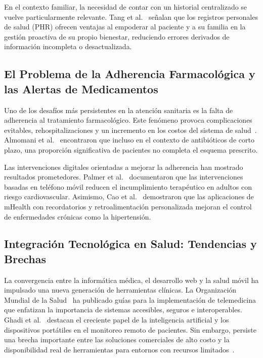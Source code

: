 \documentclass[12pt, letterpaper]{report}
\begin{document}
En el contexto familiar, la necesidad de contar con un historial centralizado se vuelve
particularmente relevante. Tang et al.~\cite{tang2006personal} señalan que los registros
personales de salud (PHR) ofrecen ventajas al empoderar al paciente y a su familia en
la gestión proactiva de su propio bienestar, reduciendo errores derivados de información
incompleta o desactualizada.

\subsection{El Problema de la Adherencia Farmacológica y las Alertas de Medicamentos}

Uno de los desafíos más persistentes en la atención sanitaria es la falta de adherencia
al tratamiento farmacológico. Este fenómeno provoca complicaciones evitables,
rehospitalizaciones y un incremento en los costos del sistema de
salud~\cite{gokoel2020medication}. Almomani et al.~\cite{almomani2023adherence}
encontraron que incluso en el contexto de antibióticos de corto plazo, una proporción
significativa de pacientes no completa el esquema prescrito.

Las intervenciones digitales orientadas a mejorar la adherencia han mostrado resultados
prometedores. Palmer et al.~\cite{palmer2021mobile} documentaron que las intervenciones
basadas en teléfono móvil reducen el incumplimiento terapéutico en adultos con riesgo
cardiovascular. Asimismo, Cao et al.~\cite{cao2022mhealth} demostraron que las
aplicaciones de mHealth con recordatorios y retroalimentación personalizada mejoran el
control de enfermedades crónicas como la hipertensión.

\subsection{Integración Tecnológica en Salud: Tendencias y Brechas}

La convergencia entre la informática médica, el desarrollo web y la salud móvil ha
impulsado una nueva generación de herramientas clínicas. La Organización Mundial de
la Salud~\cite{world2022consolidated} ha publicado guías para la implementación de
telemedicina que enfatizan la importancia de sistemas accesibles, seguros e
interoperables. Ghadi et al.~\cite{ghadi2025integration} destacan el creciente papel
de la inteligencia artificial y los dispositivos portátiles en el monitoreo remoto de
pacientes. Sin embargo, persiste una brecha importante entre las soluciones comerciales
de alto costo y la disponibilidad real de herramientas para entornos con recursos
limitados~\cite{roehrs2017omniphr}.
\end{document}

